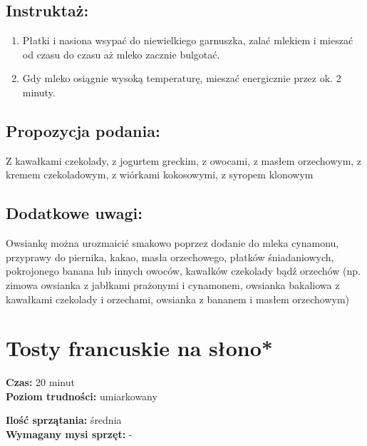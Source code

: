 \documentclass[a4paper,10pt]{book}
\begin{document}
\vspace{0.5cm} 

\section*{Instruktaż:}
\begin{enumerate}
    \item Płatki i nasiona wsypać do niewielkiego garnuszka, zalać mlekiem i mieszać od czasu do czasu aż mleko zacznie bulgotać.
    \item Gdy mleko osiągnie wysoką temperaturę, mieszać energicznie przez ok. 2 minuty.
\end{enumerate}

\vspace{0.5cm} 

\small
\section*{Propozycja podania:}
Z kawałkami czekolady, z jogurtem greckim, z owocami, z masłem orzechowym, z kremem czekoladowym, z wiórkami kokosowymi, z syropem klonowym

\vspace{0.3cm}

\section*{Dodatkowe uwagi:}
Owsiankę można urozmaicić smakowo poprzez dodanie do mleka cynamonu, przyprawy do piernika, kakao, masła orzechowego, płatków śniadaniowych, pokrojonego banana lub innych owoców, kawałków czekolady bądź orzechów (np. zimowa owsianka z jabłkami prażonymi i cynamonem, owsianka bakaliowa z kawałkami czekolady i orzechami, owsianka z bananem i masłem orzechowym)

\newpage 

\chapter{Tosty francuskie na słono*}

\vspace{0.1cm}
\small
\begin{minipage}{0.45\textwidth}
    \noindent \textbf{Czas:} 20 minut \\
    \textbf{Poziom trudności:} umiarkowany
\end{minipage}
\begin{minipage}{0.45\textwidth}
    \noindent \textbf{Ilość sprzątania:} średnia\\
    \textbf{Wymagany mysi sprzęt:} -
\end{minipage}
\normalsize
\vspace{0.5cm}
\end{document}
